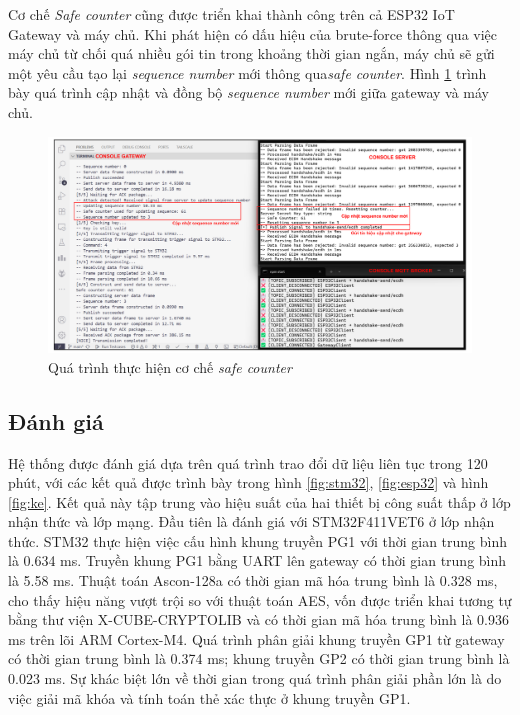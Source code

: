 Cơ chế \textit{Safe counter} cũng được triển khai thành công trên cả ESP32 IoT Gateway và máy chủ. Khi phát hiện có dấu hiệu của brute-force thông qua việc máy chủ từ chối quá nhiều gói tin trong khoảng thời gian ngắn, máy chủ sẽ gửi một yêu cầu tạo lại \textit{sequence number} mới thông qua\textit{safe counter}. Hình \ref{fig:sclog} trình bày quá trình cập nhật và đồng bộ \textit{sequence number} mới giữa gateway và máy chủ.

\begin{figure}[h]
    \centering
    \includegraphics[width=1\linewidth]{sclog.pdf}
    \caption{Quá trình thực hiện cơ chế \textit{safe counter}}
    \label{fig:sclog}
\end{figure}

\subsection{Đánh giá}
\label{sec:res}
Hệ thống được đánh giá dựa trên quá trình trao đổi dữ liệu liên tục trong 120 phút, với các kết quả được trình bày trong hình \ref{fig:stm32}, \ref{fig:esp32} và hình \ref{fig:ke}. Kết quả này tập trung vào hiệu suất của hai thiết bị công suất thấp ở lớp nhận thức và lớp mạng. Đầu tiên là đánh giá với STM32F411VET6 ở lớp nhận thức. STM32 thực hiện việc cấu hình khung truyền PG1 với thời gian trung bình là 0.634 ms. Truyền khung PG1 bằng UART lên gateway có thời gian trung bình là 5.58 ms. Thuật toán Ascon-128a có thời gian mã hóa trung bình là 0.328 ms, cho thấy hiệu năng vượt trội so với thuật toán AES, vốn được triển khai tương tự bằng thư viện X-CUBE-CRYPTOLIB và có thời gian mã hóa trung bình là 0.936 ms trên lõi ARM Cortex-M4. Quá trình phân giải khung truyền GP1 từ gateway có thời gian trung bình là 0.374 ms; khung truyền GP2 có thời gian trung bình là 0.023 ms. Sự khác biệt lớn về thời gian trong quá trình phân giải phần lớn là do việc giải mã khóa và tính toán thẻ xác thực ở khung truyền GP1.

